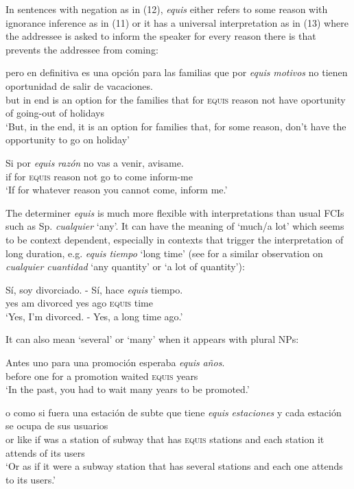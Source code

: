 \documentclass[output=paper
,modfonts
,nonflat]{langsci/langscibook}
\begin{document}
In sentences with negation as in (12), \textit{equis} either refers to some reason with ignorance inference as in (11) or it has a universal interpretation as in (13) where the addressee is asked to inform the speaker for every reason there is that prevents the addressee from coming:

\ea
\gll  pero en definitiva es una opción para las familias que por \textit{equis} \textit{motivos} no tienen oportunidad de salir de vacaciones.\\
but in end is an option for the families that for \textsc{equis} reason not have oportunity of going-out of holidays\\
\glt ‘But, in the end, it is an option for families that, for some reason, don’t have the opportunity to go on holiday’
\z

\ea
\gll  Si por \textit{equis} \textit{razón} no vas a venir, avisame.\\
if for \textsc{equis} reason not go to come inform-me\\
\glt ‘If for whatever reason you cannot come, inform me.’
\z

The determiner \textit{equis} is much more flexible with interpretations than usual FCIs such as Sp. \textit{cualquier} ‘any’. It can have the meaning of ‘much/a lot’ which seems to be context dependent, especially in contexts that trigger the interpretation of long duration, e.g. \textit{equis tiempo} ‘long time’ (see \citealt{Rivero2011} for a similar observation on \textit{cualquier cuantidad} ‘any quantity’ or ‘a lot of quantity’):

\ea
\gll Sí, soy divorciado. - Sí, hace \textit{equis} tiempo.\\
yes am divorced {} yes ago \textsc{equis} time\\
\glt ‘Yes, I’m divorced. - Yes, a long time ago.’
\z

It can also mean ‘several’ or ‘many’ when it appears with plural NPs:

\ea
\gll  Antes uno para una promoción esperaba \textit{equis} \textit{años}.\\
before one for a promotion waited \textsc{equis} years\\
\glt ‘In the past, you had to wait many years to be promoted.’
\z

\ea
\gll  o como si fuera una estación de subte que tiene \textit{equis} \textit{estaciones} y cada estación se ocupa de sus usuarios\\
or like if was a station of subway that has \textsc{equis} stations and each station it attends of its users\\
\glt ‘Or as if it were a subway station that has several stations and each one attends to its users.’
\z
\end{document}
